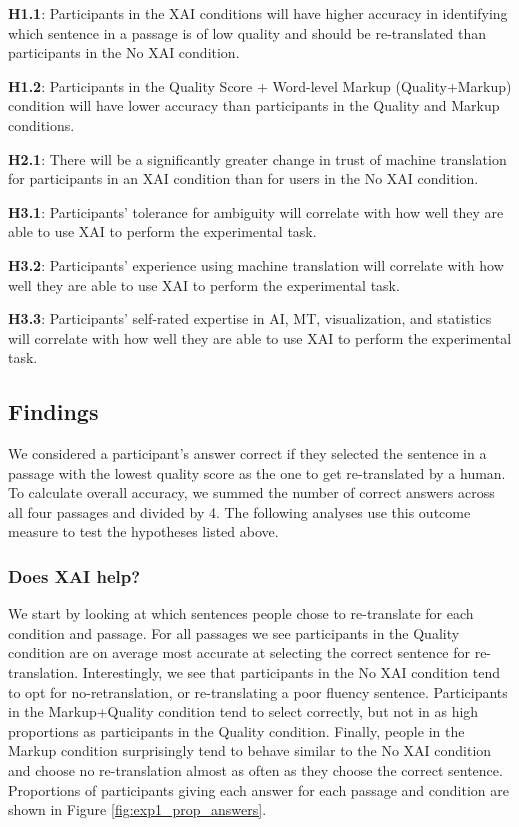 \begin{compacthang}
    \item \textbf{H1.1}: Participants in the XAI conditions will have higher accuracy in identifying which sentence in a passage is of low quality and should be re-translated than participants in the No XAI condition. 
    \item \textbf{H1.2}: Participants in the Quality Score + Word-level Markup (Quality+Markup) condition will have lower accuracy than participants in the Quality and Markup conditions. 
    \item \textbf{H2.1}: There will be a significantly greater change in trust of machine translation for participants in an XAI condition than for users in the No XAI condition. 
    \item \textbf{H3.1}: Participants’ tolerance for ambiguity will correlate with how well they are able to use XAI to perform the experimental task. 
    \item \textbf{H3.2}: Participants’ experience using machine translation will correlate with how well they are able to use XAI to perform the experimental task. 
    \item \textbf{H3.3}: Participants’ self-rated expertise in AI, MT, visualization, and statistics will correlate with how well they are able to use XAI to perform the experimental task.   
\end{compacthang}

\subsection{Findings}

We considered a participant’s answer correct if they selected the sentence in a passage with the lowest quality score as the one to get re-translated by a human. To calculate overall accuracy, we summed the number of correct answers across all four passages and divided by 4. The following analyses use this outcome measure to test the hypotheses listed above.

\subsubsection{Does XAI help?}

We start by looking at which sentences people chose to re-translate for each condition and passage. For all  passages we see participants in the Quality condition are on average most accurate at selecting the correct sentence for re-translation. Interestingly, we see that participants in the No XAI condition tend to opt for no-retranslation, or re-translating a poor fluency sentence. Participants in the Markup+Quality condition tend to select correctly, but not in as high proportions as participants in the Quality condition. Finally, people in the Markup condition surprisingly tend to behave similar to the No XAI condition and choose no re-translation almost as often as they choose the correct sentence. Proportions of participants giving each answer for each passage and condition are shown in Figure \ref{fig:exp1_prop_answers}.

